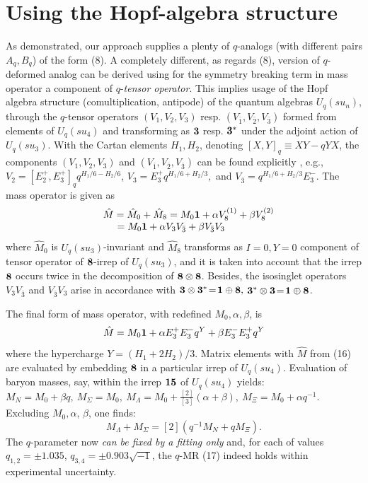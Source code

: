 \documentclass[twoside]{article}
\begin{document}
\section{Using the Hopf-algebra structure}
As demonstrated, our approach supplies a plenty of $q$-analogs
(with different pairs $A_q,B_q$) of the form (8).
A completely different, as regards (8), version of
$q$-deformed analog can be derived    \cite{ga-io}
using for the symmetry breaking term in mass operator a component
of $q$-{\em tensor operator}. This implies usage of the Hopf algebra
structure (comultiplication, antipode) of the quantum algebras
$U_q(su_n)$, through the $q$-tensor operators $(V_1,V_2,V_3)$ resp.
$(V_{\bar{1}},V_{\bar{2}},V_{\bar{3}})$ formed from elements of
$U_q(su_4)$ and transforming as ${{\bf 3}}$ resp. ${{\bf 3}^*}$
under the adjoint action of $U_q(su_3)$. With the Cartan elements
$H_1, H_2$, denoting $[X,Y]_q {\equiv} XY{-}qYX$, the components
$(V_1,V_2,V_3)$ and $(V_{\bar{1}},V_{\bar{2}},V_{\bar{3}})$
can be found explicitly          \cite{ga-io},   e.g.,
 $V_2=[E_2^+,E_3^+]_q q^{H_1/6-H_2/6}$,  $V_3=E_3^+ q^{H_1/6+H_2/3},$
and  $V_{\bar{3}}=q^{H_1/6+H_2/3} E_3^-$.
 The mass operator is given as
\[
\begin{array}{ll}
{} & \hat M = \hat M_0+\hat M_8
= M_0 {\bf 1} + \alpha V_8^{(1)} + \beta V_8^{(2)}   \\
{} & \hspace{5mm}
= M_0 {\bf 1} +\alpha V_3 V_{\bar{3}} + \beta V_{\bar{3}} V_3
\end{array}
\]
where $\hat{M}_0$ is $U_q(su_3)$-invariant and $\hat{M}_8$ transforms
as $I\!=\!0,Y\!=\!0$ component of tensor operator of ${\bf 8}$-irrep
of $U_q(su_3)$, and it is taken into account that the irrep ${\bf 8}$
occurs twice in the decomposition of ${{\bf 8}}\otimes{{\bf 8}}$.
Besides, the isosinglet operators $V_{3}V_{\bar{3}}$ and
$V_{\bar{3}}V_{3}$ arise in accordance with
${{\bf 3}}\otimes {{\bf 3}}^*\!=\!{{\bf 1}}\oplus {{\bf 8}},$
${{\bf 3}}^*\otimes {{\bf 3}}\!=\!{{\bf 1}}\oplus {{\bf 8}}$.

The final form of mass operator, with redefined $M_0,\alpha,\beta$, is
\begin{equation}
\hat M = M_0 {\bf 1}
 +\alpha E_3^+ E_3^- q^Y + \beta E_3^- E_3^+ q^Y               \label{16}
\end{equation}
where the hypercharge $Y=(H_1+2H_2)/3$.
Matrix elements with $\hat M$ from (16) are evaluated by
embedding ${\bf 8}$ in a particular irrep of $U_q(su_4).$
Evaluation of baryon masses, say,  within the irrep ${\bf 15}$
of $U_q(su_4)$ yields:
$ M_N=M_0+\beta q ,\ M_\Sigma= M_0 ,\  M_\Lambda =M_0 +
  \frac{[2]}{[3]} (\alpha+\beta) ,\ M_\Xi=M_0+\alpha q^{-1}$.
Excluding $M_0,\alpha$, $\beta$, one finds:
\begin{equation}
[3] M_\Lambda + M_\Sigma=[2] (q^{-1} M_N+q M_\Xi) .            \label{17}
\end{equation}
The $q$-parameter now {\it can be fixed by a fitting only} and,
for each of values $q_{1,2}=\pm 1.035$, $q_{3,4}=\pm 0.903 \sqrt{-1}$,
the $q$-MR (17) indeed holds within experimental uncertainty.
\end{document}
